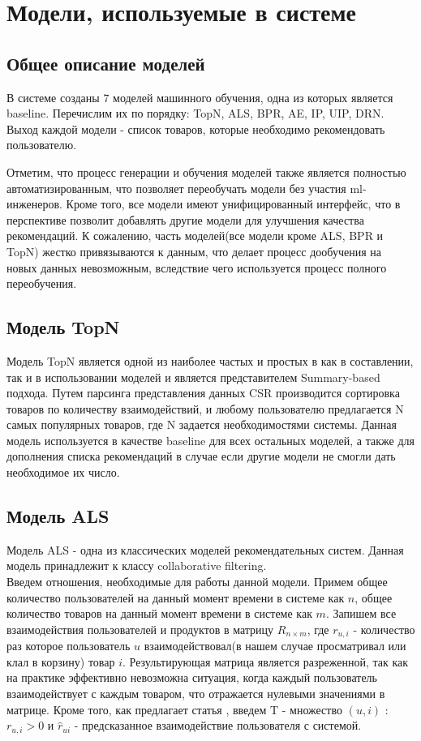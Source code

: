 \documentclass[14pt]{mmcs_article}
\begin{document}
\section{Модели, используемые в системе}

\subsection{Общее описание моделей}
В системе созданы 7 моделей машинного обучения, одна из которых является baseline. Перечислим их по порядку: TopN, ALS, BPR, AE, IP, UIP, DRN. Выход каждой модели - список товаров, которые необходимо рекомендовать пользователю. 

Отметим, что процесс генерации и обучения моделей также является полностью автоматизированным, что позволяет переобучать модели без участия ml-инженеров. Кроме того, все модели имеют унифицированный интерфейс, что в перспективе позволит добавлять другие модели для улучшения качества рекомендаций. К сожалению, часть моделей(все модели кроме ALS, BPR и TopN) жестко привязываются к данным, что делает процесс дообучения на новых данных невозможным, вследствие чего используется процесс полного переобучения. 


\subsection{Модель TopN}
Модель TopN является одной из наиболее частых и простых в как в составлении, так и в использовании моделей и является представителем Summary-based подхода. \cite{ALS:recsys} Путем парсинга представления данных CSR производится сортировка товаров по количеству взаимодействий, и любому пользователю предлагается N самых популярных товаров, где N задается необходимостями системы. Данная модель используется в качестве baseline для всех остальных моделей, а также для дополнения списка рекомендаций в случае если другие модели не смогли дать необходимое их число.
\subsection{Модель ALS}
Модель ALS \cite{ALS:CFIFD} - одна из классических моделей рекомендательных систем. Данная модель принадлежит к классу collaborative filtering. \\
Введем отношения, необходимые для работы данной модели.
Примем общее количество пользователей на данный момент времени в системе как $n$, общее количество товаров на данный момент времени в системе как $m$. Запишем все взаимодействия пользователей и продуктов в матрицу $R_{n \times m}$, где $r_{u,i}$ - количество раз которое пользователь $u$ взаимодействовал(в нашем случае просматривал или клал в корзину) товар $i$.  Результирующая матрица является разреженной, так как на практике эффективно невозможна ситуация, когда каждый пользователь взаимодействует с каждым товаром, что отражается нулевыми значениями в матрице. Кроме того, как предлагает статья \cite {ALS:rwe}, введем $\mathrm{T}$ - множество $(u, i)$ : $r_{u,i} > 0$ и $\hat{r}_{ui}$ - предсказанное взаимодействие пользователя с системой.
\end{document}
